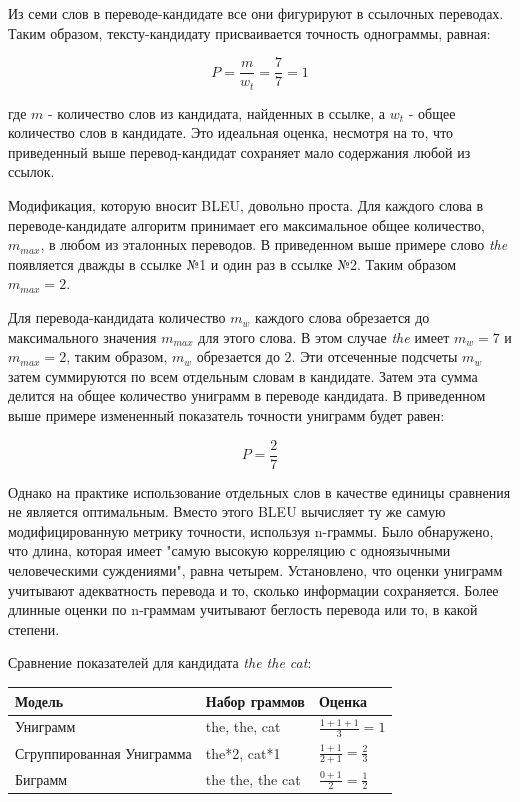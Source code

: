     Из семи слов в переводе-кандидате все они фигурируют в ссылочных переводах. Таким образом, тексту-кандидату присваивается точность однограммы, равная:
    
    $$
        P = \frac{m}{w_t} = \frac{7}{7} = 1
    $$
    
    где $m$ - количество слов из кандидата, найденных в ссылке, а $w_t$ - общее количество слов в кандидате. Это идеальная оценка, несмотря на то, что приведенный выше перевод-кандидат сохраняет мало содержания любой из ссылок.
    
    Модификация, которую вносит BLEU, довольно проста. Для каждого слова в переводе-кандидате алгоритм принимает его максимальное общее количество, $m_{max}$, в любом из эталонных переводов. В приведенном выше примере слово \textit{the} появляется дважды в ссылке №1 и один раз в ссылке №2. Таким образом $m_{max}=2$.
    
    Для перевода-кандидата количество $m_{w}$ каждого слова обрезается до максимального значения $m_{max}$ для этого слова. В этом случае \textit{the} имеет $m_{w}=7$ и $m_{max}=2$, таким образом, $m_{w}$ обрезается до $2$. Эти отсеченные подсчеты $m_{w}$ затем суммируются по всем отдельным словам в кандидате. Затем эта сумма делится на общее количество униграмм в переводе кандидата. В приведенном выше примере измененный показатель точности униграмм будет равен:
    
    $$
        P = \frac{2}{7}
    $$
    
    Однако на практике использование отдельных слов в качестве единицы сравнения не является оптимальным. Вместо этого BLEU вычисляет ту же самую модифицированную метрику точности, используя n-граммы. Было обнаружено, что длина, которая имеет "самую высокую корреляцию с одноязычными человеческими суждениями", равна четырем. Установлено, что оценки униграмм учитывают адекватность перевода и то, сколько информации сохраняется. Более длинные оценки по n-граммам учитывают беглость перевода или то, в какой степени.
    
    Сравнение показателей для кандидата \textit{the the cat}:
    
    \begin{table}[h]
        \centering
        \begin{tabular}{|l|l|l|}
        \hline
        Модель                    & Набор граммов    & Оценка \\ \hline
        Униграмм                  & the, the, cat    & $\frac{1+1+1}{3} = 1$      \\ \hline
        Сгруппированная Униграмма & the*2, cat*1     & $\frac{1+1}{2+1} = \frac{2}{3}$      \\ \hline
        Биграмм                   & the the, the cat & $\frac{0+1}{2} = \frac{1}{2}$       \\ \hline
        \end{tabular}
    \end{table}
    
